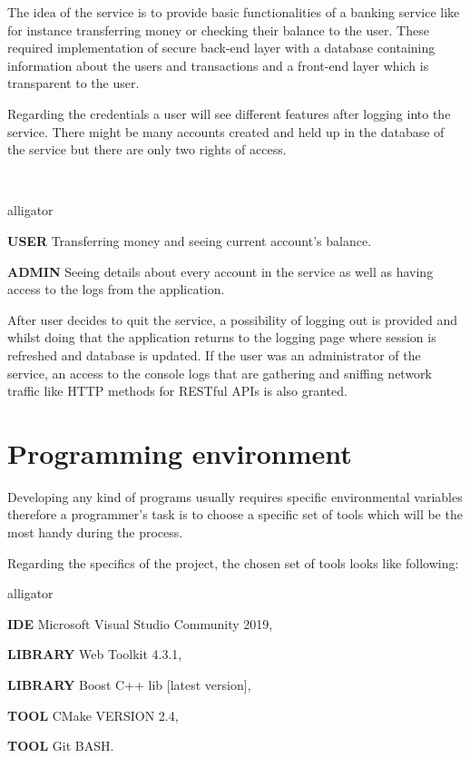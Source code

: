 \documentclass[a4paper,12pt]{book}
\newcommand\tab[1][1cm]{\hspace*{#1}}
\begin{document}
{{\bigskip
The idea of the service is to provide basic functionalities of a banking service like for instance transferring money or checking their balance to the user. These required implementation of secure back-end layer with a database containing information about the users and transactions and a front-end layer which is transparent to the user. 

\bigskip
Regarding the credentials a user will see different features after logging into the service. There might be many accounts created and held up in the database of the service but there are only two rights of access.}\\
\begin{labeling}{alligator}
\item [\textbf{USER}] Transferring money and seeing current account's balance.
\item [\textbf{ADMIN}] Seeing details about every account in the service as well as having access to the logs from the application.
\end{labeling}

\bigskip
After user decides to quit the service, a possibility of logging out is provided and whilst doing that the application returns to the logging page where session is refreshed and database is updated. If the user was an administrator of the service, an access to the console logs that are gathering and sniffing network traffic like HTTP methods for RESTful APIs is also granted.  

\section{Programming environment}
{\tab Developing any kind of programs usually requires specific environmental variables therefore a programmer's task is to choose a specific set of tools which will be the most handy during the process.  

\bigskip
Regarding the specifics of the project, the chosen set of tools looks like following:
\begin{labeling}{alligator}
\item [\textbf{IDE}] Microsoft Visual Studio Community 2019,
\item [\textbf{LIBRARY}] Web Toolkit 4.3.1,
\item [\textbf{LIBRARY}] Boost C++ lib [latest version],
\item [\textbf{TOOL}] CMake VERSION 2.4,
\item [\textbf{TOOL}] Git BASH.
\end{labeling}}

}
\end{document}
